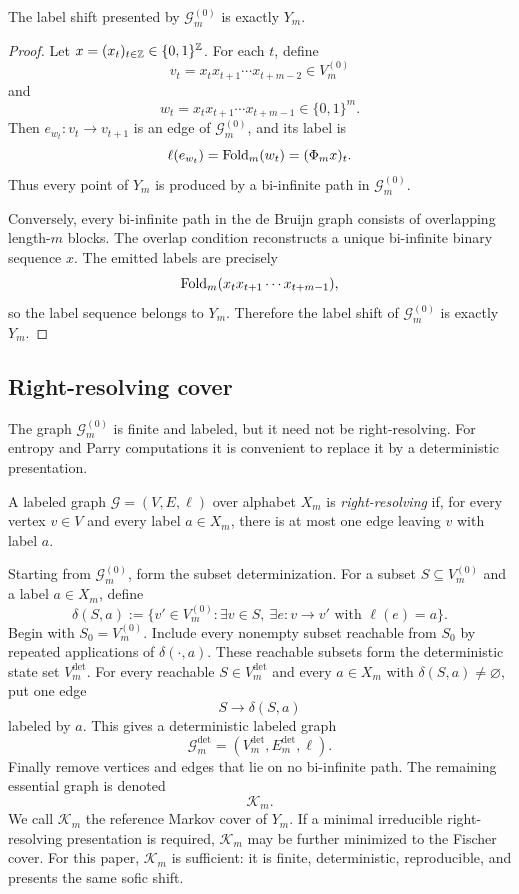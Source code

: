 \begin{proposition}
\label{prop:debruijn-presentation}
The label shift presented by \(\mathcal G_m^{(0)}\) is exactly \(Y_m\).
\end{proposition}

\begin{proof}
Let \(x=(x_t)_{t\in\mathbb{Z}}\in\{0,1\}^{\mathbb{Z}}\).  For each \(t\), define
\[
v_t=x_tx_{t+1}\cdots x_{t+m-2}\in V_m^{(0)}
\]
and
\[
w_t=x_tx_{t+1}\cdots x_{t+m-1}\in\{0,1\}^m.
\]
Then \(e_{w_t}:v_t\to v_{t+1}\) is an edge of \(\mathcal G_m^{(0)}\), and its label is
\[
\ell(e_{w_t})=\operatorname{Fold}_m(w_t)=(\Phi_m x)_t.
\]
Thus every point of \(Y_m\) is produced by a bi-infinite path in \(\mathcal G_m^{(0)}\).

Conversely, every bi-infinite path in the de Bruijn graph consists of overlapping length-\(m\) blocks.  The overlap condition reconstructs a unique bi-infinite binary sequence \(x\).  The emitted labels are precisely
\[
\operatorname{Fold}_m(x_tx_{t+1}\cdots x_{t+m-1}),
\]
so the label sequence belongs to \(Y_m\).  Therefore the label shift of \(\mathcal G_m^{(0)}\) is exactly \(Y_m\).
\end{proof}

\subsection{Right-resolving cover}

The graph \(\mathcal G_m^{(0)}\) is finite and labeled, but it need not be right-resolving.  For entropy and Parry computations it is convenient to replace it by a deterministic presentation.

A labeled graph \(\mathcal G=(V,E,\ell)\) over alphabet \(X_m\) is \emph{right-resolving} if, for every vertex \(v\in V\) and every label \(a\in X_m\), there is at most one edge leaving \(v\) with label \(a\).

Starting from \(\mathcal G_m^{(0)}\), form the subset determinization.  For a subset \(S\subseteq V_m^{(0)}\) and a label \(a\in X_m\), define
\[
\delta(S,a):=
\{v'\in V_m^{(0)}:\exists v\in S,\ \exists e:v\to v'\text{ with }\ell(e)=a\}.
\]
Begin with \(S_0=V_m^{(0)}\).  Include every nonempty subset reachable from \(S_0\) by repeated applications of \(\delta(\cdot,a)\).  These reachable subsets form the deterministic state set \(V_m^{\det}\).  For every reachable \(S\in V_m^{\det}\) and every \(a\in X_m\) with \(\delta(S,a)\neq\varnothing\), put one edge
\[
S\longrightarrow \delta(S,a)
\]
labeled by \(a\).  This gives a deterministic labeled graph
\[
\mathcal G_m^{\det}=(V_m^{\det},E_m^{\det},\ell).
\]
Finally remove vertices and edges that lie on no bi-infinite path.  The remaining essential graph is denoted
\[
\mathcal K_m.
\]
We call \(\mathcal K_m\) the reference Markov cover of \(Y_m\).  If a minimal irreducible right-resolving presentation is required, \(\mathcal K_m\) may be further minimized to the Fischer cover.  For this paper, \(\mathcal K_m\) is sufficient: it is finite, deterministic, reproducible, and presents the same sofic shift.

